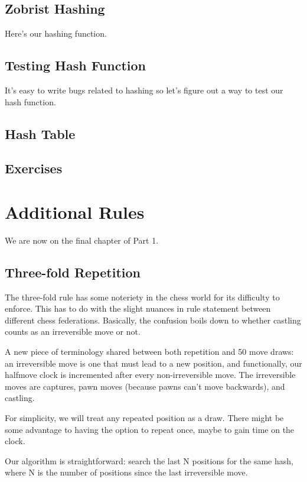 \documentclass[letterpaper,11pt]{article}
\begin{document}
\subsection{Zobrist Hashing}

Here's our hashing function.

\subsection{Testing Hash Function}

It's easy to write bugs related to hashing so let's figure out a way to test our hash function.

\subsection{Hash Table}

\subsection{Exercises}

\section{Additional Rules}

We are now on the final chapter of Part 1.

\subsection{Three-fold Repetition}

The three-fold rule has some noteriety in the chess world for its difficulty to enforce. This has 
to do with the slight nuances in rule statement between different chess federations.
Basically, the confusion boils down to whether castling counts as an irreversible move or not.

A new piece of terminology shared between both repetition and 50 move draws: an irreversible move is one that must lead to a new position, and functionally,
our halfmove clock is incremented after every non-irreversible move. The irreversible moves are 
captures, pawn moves (because pawns can't move backwards), and castling.

For simplicity, we will treat any repeated position as a draw. There might be some advantage 
to having the option to repeat once, maybe to gain time on the clock.

Our algorithm is straightforward: search the last N positions for the same hash, where N is the number of positions since the last
irreversible move.
\end{document}
